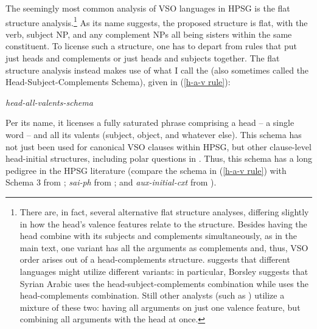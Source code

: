 \documentclass[output=paper
	        ,collection
	        ,collectionchapter
 	        ,biblatex
                ,babelshorthands
                ,newtxmath
                ,draftmode
                ,colorlinks, citecolor=brown
]{langscibook}
\begin{document}
The seemingly most common analysis of VSO languages  in HPSG is the flat structure analysis.\footnote{There are, in fact, several alternative flat structure analyses, differing slightly in how the head's valence features relate to the structure. Besides having the head combine with its subjects and complements simultaneously, as in the main text, one variant has all the arguments as complements and, thus, VSO order arises out of a head-complements structure. \citet{borsley95} suggests that different languages might utilize different variants: in particular, Borsley suggests that Syrian Arabic uses the head-subject-complements combination while  uses the head-complements combination. Still other analysts (such as \citealt{ball08thesis,ball17}) utilize a mixture of these two: having all arguments on just one valence feature, but combining all arguments with the head at once.} As its name suggests, the proposed structure is flat, with the verb, subject NP, and any complement NPs all being sisters within the same constituent. To license such a structure, one has to depart from rules that put just heads and complements or just heads and subjects together. The flat structure analysis instead makes use of what I call the  (also sometimes called the Head-Subject-Complements Schema), given in (\ref{h-a-v rule}):   
%
\begin{samepage}
\begin{exe}
\ex \label{h-a-v rule}
\emph{head-all-valents-schema} \impl  \\
\end{exe}
\end{samepage}
%
Per its name, it licenses a fully saturated phrase comprising a head -- a single word -- and all its valents (subject, object, and whatever else). This schema has not just been used for canonical VSO clauses within HPSG, but other clause-level head-initial structures, including polar questions in . Thus, this schema has a long pedigree in the HPSG literature (compare the schema in (\ref{h-a-v rule}) with Schema 3 from \citealt[40]{ps2}; \textit{sai-ph} from \citealt[36]{GSag2000a-u}; and \textit{aux-initial-cxt} from \citealt[188]{Sag2012a}).
 
\end{document}
